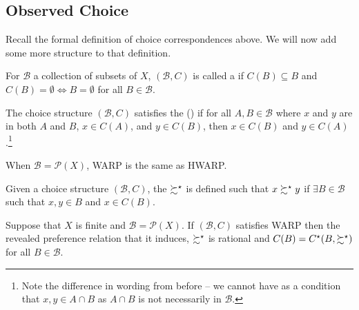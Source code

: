 \documentclass[12pt]{article}
\begin{document}
\subsection{Observed Choice}

Recall the formal definition of choice correspondences above. We will now add some more structure to that definition.

\begin{definition}
	For $\mathcal{B}$ a collection of subsets of $X$, $(\mathcal{B},C)$ is called a  if $C(B) \subseteq B$ and $C(B) = \emptyset \Longleftrightarrow B = \emptyset$ for all $B \in \mathcal{B}$.
\end{definition}

\begin{definition}
	The choice structure $(\mathcal{B},C)$ satisfies the  () if for all $A,B \in \mathcal{B}$ where $x$ and $y$ are in both $A$ and $B$, $x \in C(A)$, and $y\in C(B)$, then $x \in C(B)$ and $y \in C(A)$.\footnote{Note the difference in wording from before -- we cannot have as a condition that $x,y \in A \cap B$ as $A \cap B$ is not necessarily in $\mathcal{B}$.}
\end{definition}
\begin{remark}
	When $\mathcal{B} = \mathcal{P}(X)$, WARP is the same as HWARP.
\end{remark}
\begin{definition}
	Given a choice structure $(\mathcal{B},C)$, the  $\succsim^\star$ is defined such that $x \succsim^\star y$ if $\exists B \in \mathcal{B}$ such that $x,y \in B$ and $x \in C(B)$.
\end{definition}
\begin{proposition}\label{prop:warp_rationality}
	Suppose that $X$ is finite and $\mathcal{B} = \mathcal{P}(X)$. If $(\mathcal{B},C)$ satisfies WARP then the revealed preference relation that it induces, $\succsim^\star$ is rational and $C(B) = C^\star(B,\succsim^\star)$ for all $B \in \mathcal{B}$.
\end{proposition}
\end{document}
